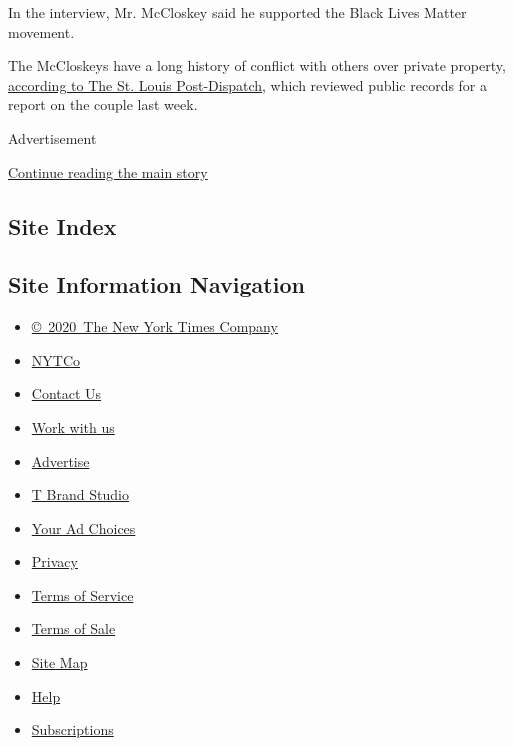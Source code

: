 In the interview, Mr. McCloskey said he supported the Black Lives Matter
movement.

The McCloskeys have a long history of conflict with others over private
property,
\href{https://www.stltoday.com/news/local/metro/portland-place-couple-who-confronted-protesters-have-a-long-history-of-not-backing-down/article_281d9989-373e-53c3-abcb-ecd0225dd287.html}{according
to The St. Louis Post-Dispatch}, which reviewed public records for a
report on the couple last week.

Advertisement

\protect\hyperlink{after-bottom}{Continue reading the main story}

\hypertarget{site-index}{%
\subsection{Site Index}\label{site-index}}

\hypertarget{site-information-navigation}{%
\subsection{Site Information
Navigation}\label{site-information-navigation}}

\begin{itemize}
\tightlist
\item
  \href{https://help.nytimes3xbfgragh.onion/hc/en-us/articles/115014792127-Copyright-notice}{©~2020~The
  New York Times Company}
\end{itemize}

\begin{itemize}
\tightlist
\item
  \href{https://www.nytco.com/}{NYTCo}
\item
  \href{https://help.nytimes3xbfgragh.onion/hc/en-us/articles/115015385887-Contact-Us}{Contact
  Us}
\item
  \href{https://www.nytco.com/careers/}{Work with us}
\item
  \href{https://nytmediakit.com/}{Advertise}
\item
  \href{http://www.tbrandstudio.com/}{T Brand Studio}
\item
  \href{https://www.nytimes3xbfgragh.onion/privacy/cookie-policy\#how-do-i-manage-trackers}{Your
  Ad Choices}
\item
  \href{https://www.nytimes3xbfgragh.onion/privacy}{Privacy}
\item
  \href{https://help.nytimes3xbfgragh.onion/hc/en-us/articles/115014893428-Terms-of-service}{Terms
  of Service}
\item
  \href{https://help.nytimes3xbfgragh.onion/hc/en-us/articles/115014893968-Terms-of-sale}{Terms
  of Sale}
\item
  \href{https://spiderbites.nytimes3xbfgragh.onion}{Site Map}
\item
  \href{https://help.nytimes3xbfgragh.onion/hc/en-us}{Help}
\item
  \href{https://www.nytimes3xbfgragh.onion/subscription?campaignId=37WXW}{Subscriptions}
\end{itemize}
